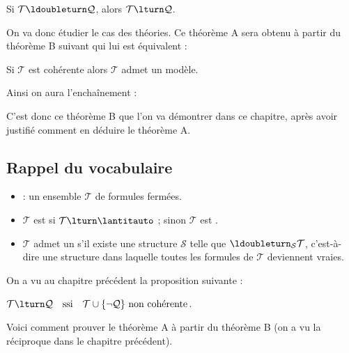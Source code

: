 \documentclass[11pt,class=report,crop=false]{standalone}
\begin{document}
\begin{theoreme}[Théorème A]
	Si $\mathcal{T} \ldoubleturn \mathcal{Q}$, alors $\mathcal{T} \lturn \mathcal{Q}$.
\end{theoreme}

On va donc étudier le cas des théories. Ce théorème A sera obtenu à partir du théorème B suivant qui lui est équivalent :

\begin{theoreme}[Théorème B]
	Si $\mathcal{T}$ est cohérente alors $\mathcal{T}$ admet un modèle.
\end{theoreme}

Ainsi on aura l'enchaînement :


C'est donc ce théorème B que l'on va démontrer dans ce chapitre, après avoir justifié comment en déduire le théorème A.

\subsection{Rappel du vocabulaire}

\begin{itemize}
	\item {} : un ensemble $\mathcal{T}$ de formules fermées.
	
	\item $\mathcal{T}$ est  si $\mathcal{T} \lturn \lantitauto$ ; sinon $\mathcal{T}$ est .
	
	\item $\mathcal{T}$ admet un  s'il existe une structure $\mathcal{S}$ telle que $\ldoubleturn_{\mathcal{S}} \mathcal{T}$, c'est-à-dire une structure dans laquelle toutes les formules de $\mathcal{T}$ deviennent vraies.
\end{itemize}

On a vu au chapitre précédent la proposition suivante :
\begin{proposition}
	\label{prop:noncoherente}
	$\mathcal{T} \lturn \mathcal{Q} \quad \text{ssi} \quad \mathcal{T} \cup \{ \lnot \mathcal{Q} \} \text{ non cohérente}$.
\end{proposition}

Voici comment prouver le théorème A à partir du théorème B (on a vu la réciproque dans le chapitre précédent).
\end{document}
